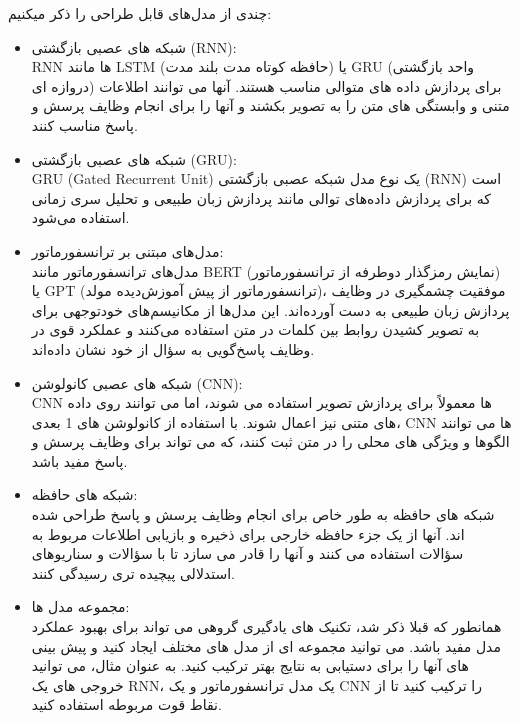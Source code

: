 چندی از مدل‌های قابل طراحی را ذکر میکنیم:
\begin{itemize}
    \item شبکه های عصبی بازگشتی (RNN):\\
    RNN ها مانند LSTM (حافظه کوتاه مدت بلند مدت) یا GRU (واحد بازگشتی دروازه ای) برای پردازش داده های متوالی مناسب هستند. آنها می توانند اطلاعات متنی و وابستگی های متن را به تصویر بکشند و آنها را برای انجام وظایف پرسش و پاسخ مناسب کنند.\\
    \item شبکه های عصبی بازگشتی (GRU):\\
    GRU (Gated Recurrent Unit) یک نوع مدل شبکه عصبی بازگشتی (RNN) است که برای پردازش داده‌های توالی مانند پردازش زبان طبیعی و تحلیل سری زمانی استفاده می‌شود.
    \item مدل‌های مبتنی بر ترانسفورماتور:\\
    مدل‌های ترانسفورماتور مانند BERT (نمایش رمزگذار دوطرفه از ترانسفورماتور) یا GPT (ترانسفورماتور از پیش آموزش‌دیده مولد)، موفقیت چشمگیری در وظایف پردازش زبان طبیعی به دست آورده‌اند. این مدل‌ها از مکانیسم‌های خودتوجهی برای به تصویر کشیدن روابط بین کلمات در متن استفاده می‌کنند و عملکرد قوی در وظایف پاسخ‌گویی به سؤال از خود نشان داده‌اند.\\
    \item شبکه های عصبی کانولوشن (CNN):\\
    CNN ها معمولاً برای پردازش تصویر استفاده می شوند، اما می توانند روی داده های متنی نیز اعمال شوند. با استفاده از کانولوشن های 1 بعدی، CNN ها می توانند الگوها و ویژگی های محلی را در متن ثبت کنند، که می تواند برای وظایف پرسش و پاسخ مفید باشد.\\
    \item شبکه های حافظه:\\
    شبکه های حافظه به طور خاص برای انجام وظایف پرسش و پاسخ طراحی شده اند. آنها از یک جزء حافظه خارجی برای ذخیره و بازیابی اطلاعات مربوط به سؤالات استفاده می کنند و آنها را قادر می سازد تا با سؤالات و سناریوهای استدلالی پیچیده تری رسیدگی کنند.\\
    \item مجموعه مدل ها:\\
    همانطور که قبلا ذکر شد، تکنیک های یادگیری گروهی می تواند برای بهبود عملکرد مدل مفید باشد. می توانید مجموعه ای از مدل های مختلف ایجاد کنید و پیش بینی های آنها را برای دستیابی به نتایج بهتر ترکیب کنید. به عنوان مثال، می توانید خروجی های یک RNN، یک مدل ترانسفورماتور و یک CNN را ترکیب کنید تا از نقاط قوت مربوطه استفاده کنید.\\
\end{itemize} 


